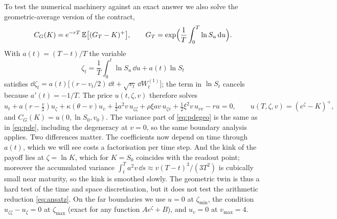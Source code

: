 To test the numerical machinery against an exact answer we also solve the geometric-average version of
the contract,
\begin{equation*}
C_G(K) = e^{-rT}\,\mathbb{E}\bigl[(G_T - K)^+\bigr],\qquad G_T = \exp\Bigl(\frac1T\int_0^T \ln S_u\,\mathrm{d} u\Bigr).
\end{equation*}
With $a(t) = (T-t)/T$ the variable
\begin{equation*}
\zeta_t = \frac1T\int_0^t \ln S_u\,\dd u + a(t)\ln S_t
\end{equation*}
satisfies $\dd\zeta_t = a(t)\bigl[(r - v_t/2)\,\dd t + \sqrt{v_t}\,\dd W^{(1)}_t\bigr]$; the term in
$\ln S_t$ cancels because $a'(t)=-1/T$. The price $u(t,\zeta,v)$ therefore solves
\begin{equation}\label{eq:pdegeo}
u_t + a(r - \tfrac v2)u_\zeta + \kappa(\theta-v)u_v + \tfrac12 a^2 v\,u_{\zeta\zeta} + \rho\xi a v\,u_{\zeta v}
+ \tfrac12\xi^2 v\,u_{vv} - r u = 0,\qquad u(T,\zeta,v) = (e^\zeta-K)^+,
\end{equation}
and $C_G(K) = u(0,\ln S_0,v_0)$. The variance part of \eqref{eq:pdegeo} is the same as in \eqref{eq:pde},
including the degeneracy at $v=0$, so the same boundary analysis applies. Two differences matter. The
coefficients now depend on time through $a(t)$, which we will see costs a factorisation per time step.
And the kink of the payoff lies at $\zeta=\ln K$, which for $K=S_0$ coincides with the readout point;
moreover the accumulated variance $\int_t^T a^2 v\,\dd s \approx v(T-t)^3/(3T^2)$ is cubically small near
maturity, so the kink is smoothed slowly. The geometric twin is thus a hard test of the time and space
discretisation, but it does not test the arithmetic reduction \eqref{eq:ansatz}. On the far boundaries we
use $u=0$ at $\zeta_{\min}$, the condition $u_{\zeta\zeta}-u_\zeta=0$ at $\zeta_{\max}$ (exact for any
function $Ae^\zeta+B$), and $u_v=0$ at $v_{\max}=4$.
